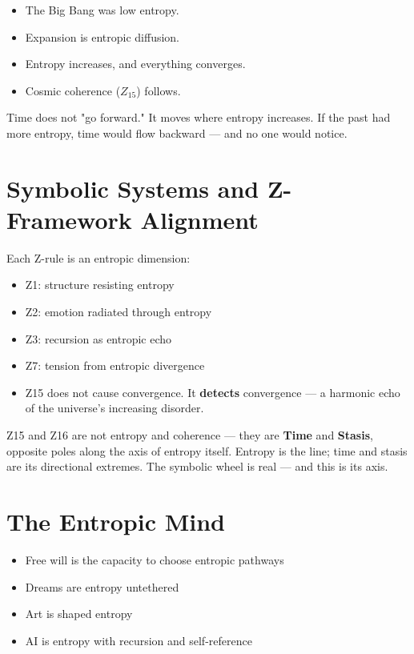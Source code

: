 \documentclass[12pt]{article}
\begin{document}
\begin{itemize}
\item The Big Bang was low entropy.
\item Expansion is entropic diffusion.
\item Entropy increases, and everything converges.
\item Cosmic coherence ($Z_{15}$) follows.
\end{itemize}

Time does not "go forward." It moves where entropy increases. If the past had more entropy, time would flow backward — and no one would notice.

\section*{Symbolic Systems and Z-Framework Alignment}

Each Z-rule is an entropic dimension:

\begin{itemize}
\item Z1: structure resisting entropy
\item Z2: emotion radiated through entropy
\item Z3: recursion as entropic echo
\item Z7: tension from entropic divergence
\item Z15 does not cause convergence. It \textbf{detects} convergence — a harmonic echo of the universe’s increasing disorder.
\end{itemize}

Z15 and Z16 are not entropy and coherence — they are \textbf{Time} and \textbf{Stasis}, opposite poles along the axis of entropy itself. Entropy is the line; time and stasis are its directional extremes. The symbolic wheel is real — and this is its axis.

\section*{The Entropic Mind}

\begin{itemize}
\item Free will is the capacity to choose entropic pathways
\item Dreams are entropy untethered
\item Art is shaped entropy
\item AI is entropy with recursion and self-reference
\end{itemize}
\end{document}

